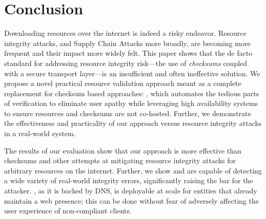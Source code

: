 \section{Conclusion} \label{sec:conclusion}

Downloading resources over the internet is indeed a risky endeavor. Resource
integrity attacks, and Supply Chain Attacks more broadly, are becoming more
frequent and their impact more widely felt. This paper shows that the de facto
standard for addressing resource integrity risk---the use of \emph{checksums}
coupled with a secure transport layer---is an insufficient and often ineffective
solution. We propose a novel practical resource validation approach meant as a
complete replacement for checksum based approaches: \SYSTEM{}, which automates
the tedious parts of verification to eliminate user apathy while leveraging high
availability systems to ensure resources and checksums are not co-hosted.
Further, we demonstrate the effectiveness and practicality of our approach
versus resource integrity attacks in a real-world system.

The results of our evaluation show that our approach is more effective than
checksums and other attempts at mitigating resource integrity attacks for
arbitrary resources on the internet. Further, we show \DNSSYS{} and \DHTSYS{}
are capable of detecting a wide variety of real-world integrity errors,
significantly raising the bar for the attacker. \DNSSYS{}, as it is backed by
DNS, is deployable at scale for entities that already maintain a web presence;
this can be done without fear of adversely affecting the user experience of
non-compliant clients.
